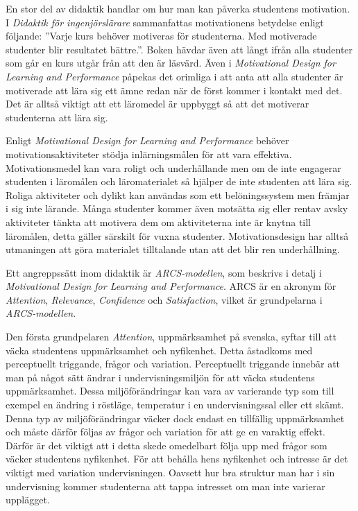 \documentclass[]{article}
\begin{document}
En stor del av didaktik handlar om hur man kan påverka studentens motivation.
I \textit{Didaktik för ingenjörslärare} sammanfattas motivationens betydelse
enligt följande: ”Varje kurs behöver motiveras för studenterna.
Med motiverade studenter blir resultatet bättre.”.
Boken hävdar även att långt ifrån alla studenter
som går en kurs utgår från att den är läsvärd.
Även i \textit{Motivational Design for Learning and Performance} påpekas det
orimliga i att anta att alla studenter är motiverade att lära sig ett ämne
redan när de först kommer i kontakt med det.
Det är alltså viktigt att ett läromedel är uppbyggt så att det motiverar
studenterna att lära sig.

Enligt \textit{Motivational Design for Learning and Performance} behöver
motivations\-aktiviteter stödja inlärningsmålen för att vara effektiva.
Motivationsmedel kan vara roligt och underhållande men om de inte engagerar
studenten i läromålen och läromaterialet så hjälper de inte studenten att
lära sig. Roliga aktiviteter och dylikt kan användas som ett belöningssystem
men främjar i sig inte lärande. Många studenter kommer även motsätta sig
eller rentav avsky aktiviteter tänkta att motivera dem om aktiviteterna
inte är knytna till läromålen, detta gäller särskilt för vuxna studenter.
Motivationsdesign har alltså utmaningen att göra materialet tilltalande
utan att det blir ren underhållning.

Ett angreppssätt inom didaktik är \textit{ARCS-modellen},
som beskrivs i detalj i
\textit{Motivational Design for Learning and Performance}.
ARCS är en akronym för \textit{Attention}, \textit{Relevance},
\textit{Confidence} och \textit{Satisfaction}, vilket är grundpelarna
i \textit{ARCS-modellen}.

Den första grundpelaren \textit{Attention}, uppmärksamhet på svenska,
syftar till att väcka studentens uppmärksamhet och nyfikenhet.
Detta åstadkoms med perceptuellt triggande, frågor och variation.
Perceptuellt triggande innebär att man på något sätt ändrar i
undervisningsmiljön för att väcka studentens uppmärksamhet.
Dessa miljöförändringar kan vara av varierande typ som till exempel en ändring
i röstläge, temperatur i en undervisningssal eller ett skämt.
Denna typ av miljöförändringar väcker dock endast en tillfällig uppmärksamhet
och måste därför följas av frågor och variation för att ge en varaktig effekt.
Därför är det viktigt att i detta skede omedelbart följa upp med frågor som väcker
studentens nyfikenhet. För att behålla hens nyfikenhet och
intresse är det viktigt med variation undervisningen.
Oavsett hur bra struktur man har i sin undervisning kommer studenterna att tappa
intresset om man inte varierar upplägget.
\end{document}

